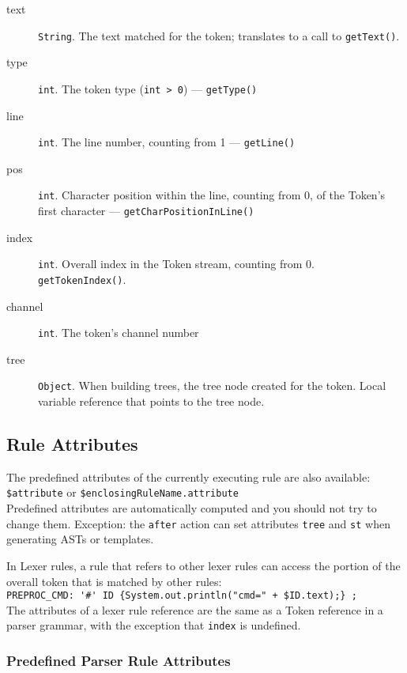 \begin{description}
\item[text] \verb=String=.
The text matched for the token; translates to a call to \verb=getText()=.

\item[type] \verb=int=.
The token type (\verb=int > 0=) --- \verb=getType()=

\item[line] \verb=int=.
The line number, counting from 1 --- \verb=getLine()=

\item[pos] \verb=int=.
Character position within the line, counting from 0,
of the Token's first character --- \verb=getCharPositionInLine()=

\item[index] \verb=int=.
Overall index in the Token stream, counting from 0.\\\verb=getTokenIndex()=.

\item[channel] \verb=int=.
The token's channel number

\item[tree] \verb=Object=.
When building trees, the tree node created for the token.
Local variable reference that points to the tree node.
\end{description}


\subsection{Rule Attributes}

The predefined attributes of the currently executing rule are also available:\\
\verb=$attribute= or \verb=$enclosingRuleName.attribute=\\
Predefined attributes are automatically computed
and you should not try to change them.
Exception: the \verb=after= action can set attributes \verb=tree= and \verb=st=
when generating ASTs or templates.

In Lexer rules, a rule that refers to other lexer rules
can access the portion of the overall token that is matched by other rules:\\
\verb|PREPROC_CMD: '#' ID {System.out.println("cmd=" + $ID.text);} ;|\\
The attributes of a lexer rule reference
are the same as a Token reference in a parser grammar,
with the exception that \verb=index= is undefined.

\subsubsection{Predefined Parser Rule Attributes}
\label{subsub:predef-parser-rule-attr}

